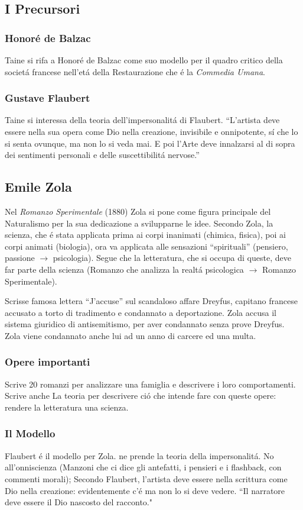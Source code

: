 \documentclass{article}
\begin{document}
\subsection{I Precursori}
\subsubsection{Honoré de Balzac}
Taine si rifa a Honoré de Balzac come suo modello per il quadro critico della societá francese nell'etá della Restaurazione che é la \emph{Commedia Umana}.
\subsubsection{Gustave Flaubert}
Taine si interessa della teoria dell'impersonalitá di Flaubert. ``L'artista deve essere nella sua opera come Dio nella creazione, invisibile e onnipotente, sí che lo si senta ovunque, ma non lo si veda mai. E poi l'Arte deve innalzarsi al di sopra dei sentimenti personali e delle suscettibilitá nervose.''
\subsection{Emile Zola}
Nel \emph{Romanzo Sperimentale} (1880) Zola si pone come figura principale del Naturalismo per la sua dedicazione a svilupparne le idee. Secondo Zola, la scienza, che é stata applicata prima ai corpi inanimati (chimica, fisica), poi ai corpi animati (biologia), ora va applicata alle sensazioni ``spirituali'' (pensiero, passione $\to$ psicologia). Segue che la letteratura, che si occupa di queste, deve far parte della scienza (Romanzo che analizza la realtá psicologica $\to$ Romanzo Sperimentale).

Scrisse famosa lettera ``J'accuse'' sul scandaloso affare Dreyfus, capitano francese accusato a torto di tradimento e condannato a deportazione. Zola accusa il sistema giuridico di antisemitismo, per aver condannato senza prove Dreyfus. Zola viene condannato anche lui ad un anno di carcere ed una multa.
\subsubsection{Opere importanti}
Scrive 20 romanzi per analizzare una famiglia e descrivere i loro comportamenti. Scrive anche La teoria per descrivere ció che intende fare con queste opere: rendere la letteratura una scienza.
\subsubsection{Il Modello}
Flaubert é il modello per Zola. ne prende la teoria della impersonalitá. No all'onniscienza (Manzoni che ci dice gli antefatti, i pensieri e i flashback, con commenti morali); Secondo Flaubert, l'artista deve essere nella scrittura come Dio nella creazione: evidentemente c'é ma non lo si deve vedere. ``Il narratore deve essere il Dio nascosto del racconto."
\end{document}
